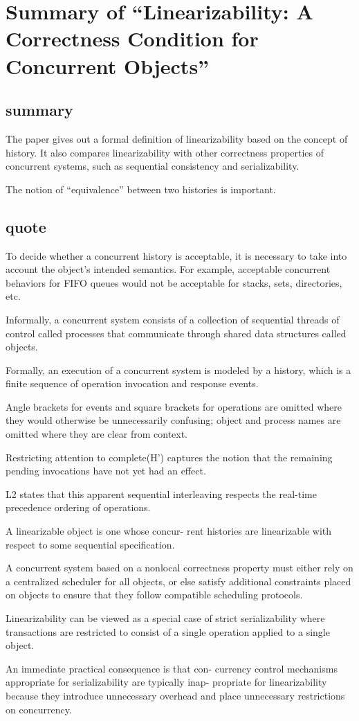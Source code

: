\documentclass{llncs}
\begin{document}
\section{Summary of ``Linearizability: A Correctness Condition for Concurrent
Objects''\cite{xxx}} 
  \label{section:linearizability_con_obj}
\subsection{summary}
The paper gives out a formal definition of linearizability based on the concept
of history. It also compares linearizability with other correctness properties
of concurrent systems, such as sequential consistency and serializability.

The notion of ``equivalence'' between two histories is important.


\subsection{quote}
To decide whether a concurrent history is acceptable, it is necessary to take
into account the object’s intended semantics. For example, acceptable concurrent
behaviors for FIFO queues would not be acceptable for stacks, sets, directories,
etc.

Informally, a concurrent system consists of a collection of sequential threads of
control called processes that communicate through shared data structures called
objects. 


Formally, an execution of a concurrent system is modeled by a history, which
is a finite sequence of operation invocation and response events. 

Angle brackets
for events and square brackets for operations are omitted where they would
otherwise be unnecessarily confusing; object and process names are omitted
where they are clear from context.

Restricting
attention to complete(H’) captures the notion that the remaining pending
invocations have not yet had an effect.


L2 states that this
apparent sequential interleaving respects the real-time precedence ordering of
operations.

A linearizable object is one whose concur-
rent histories are linearizable with respect to some sequential specification.

A concurrent system based on a nonlocal
correctness property must either rely on a centralized scheduler for all objects,
or else satisfy additional constraints placed on objects to ensure that they follow
compatible scheduling protocols. 

Linearizability can be viewed as a special case of strict serializability where
transactions are restricted to consist of a single operation applied to a single
object. 

An immediate practical consequence is that con-
currency control mechanisms appropriate for serializability are typically inap-
propriate for linearizability because they introduce unnecessary overhead and
place unnecessary restrictions on concurrency. 
\newpage
% 
% 


 
\end{document}
